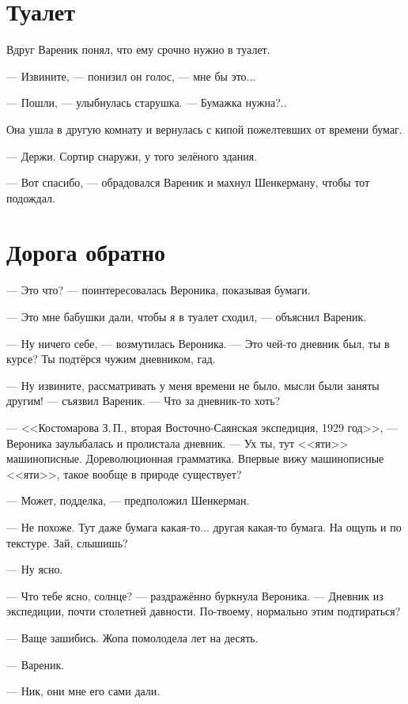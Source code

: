 \documentclass[a4paper,10pt,fleqn]{book}\usepackage{polyglossia}\setdefaultlanguage{english}\setotherlanguage{russian}\defaultfontfeatures{Ligatures=TeX,Mapping=tex-text} \usepackage{xcolor}\definecolor{lightgray}{HTML}{bbbbbb}\color{lightgray}\newcommand{\ml}[3]{\textcolor{black}{#3}}
\begin{document}
\section{Туалет}

Вдруг Вареник понял, что ему срочно нужно в туалет.

--- Извините, --- понизил он голос, --- мне бы это...

--- Пошли, --- улыбнулась старушка.
--- Бумажка нужна?..

Она ушла в другую комнату и вернулась с кипой пожелтевших от времени бумаг.

--- Держи.
Сортир снаружи, у того зелёного здания.

--- Вот спасибо, --- обрадовался Вареник и махнул Шенкерману, чтобы тот подождал.

\section{Дорога обратно}

--- Это что? --- поинтересовалась Вероника, показывая бумаги.

--- Это мне бабушки дали, чтобы я в туалет сходил, --- объяснил Вареник.

--- Ну ничего себе, --- возмутилась Вероника.
--- Это чей-то дневник был, ты в курсе?
Ты подтёрся чужим дневником, гад.

--- Ну извините, рассматривать у меня времени не было, мысли были заняты другим! --- съязвил Вареник.
--- Что за дневник-то хоть?

--- <<Костомарова З.\,П., вторая Восточно-Саянская экспедиция, 1929 год>>, --- Вероника заулыбалась и пролистала дневник.
--- Ух ты, тут <<яти>> машинописные.
Дореволюционная грамматика.
Впервые вижу машинописные <<яти>>, такое вообще в природе существует?

--- Может, подделка, --- предположил Шенкерман.

--- Не похоже.
Тут даже бумага какая-то... другая какая-то бумага.
На ощупь и по текстуре.
Зай, слышишь?

--- Ну ясно.

--- Что тебе ясно, солнце? --- раздражённо буркнула Вероника.
--- Дневник из экспедиции, почти столетней давности.
По-твоему, нормально этим подтираться?

--- Ваще зашибись.
Жопа помолодела лет на десять.

--- Вареник.

--- Ник, они мне его сами дали.
\end{document}
